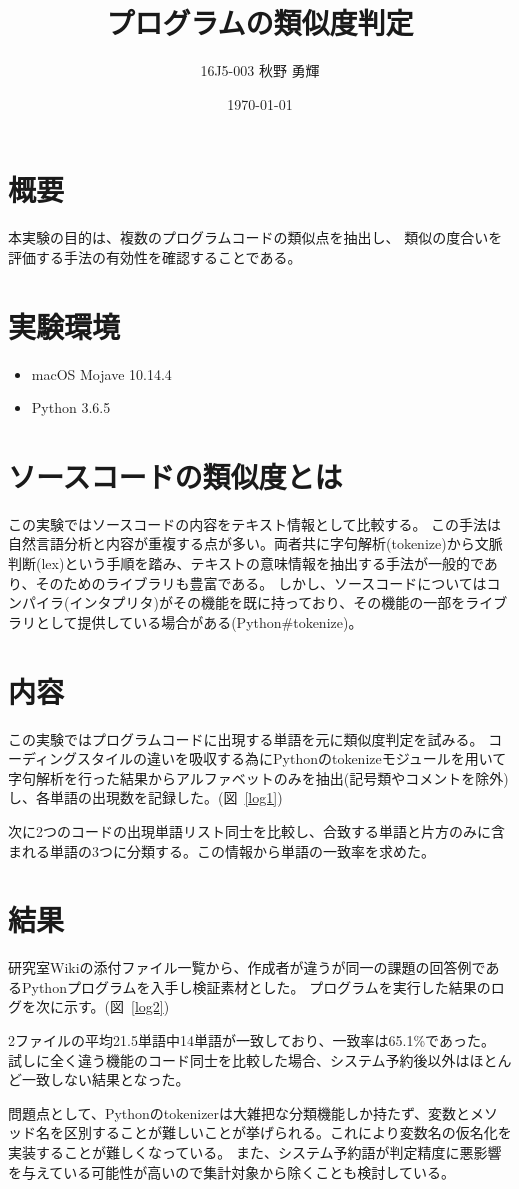 \documentclass[uplatex]{jsarticle}
\title{プログラムの類似度判定}
\author{16J5-003 秋野 勇輝}
\date{\today}
\begin{document}
\maketitle
\begin{multicols}{2}
\section{概要}
本実験の目的は、複数のプログラムコードの類似点を抽出し、
類似の度合いを評価する手法の有効性を確認することである。
\section{実験環境}
\begin{itemize}
\item macOS Mojave 10.14.4
\item Python 3.6.5
\end{itemize}
\section{ソースコードの類似度とは}
この実験ではソースコードの内容をテキスト情報として比較する。
この手法は自然言語分析と内容が重複する点が多い。両者共に字句解析(tokenize)から文脈判断(lex)という手順を踏み、テキストの意味情報を抽出する手法が一般的であり、そのためのライブラリも豊富である。
しかし、ソースコードについてはコンパイラ(インタプリタ)がその機能を既に持っており、その機能の一部をライブラリとして提供している場合がある(Python\#tokenize)。
\section{内容}
この実験ではプログラムコードに出現する単語を元に類似度判定を試みる。
コーディングスタイルの違いを吸収する為にPythonのtokenizeモジュールを用いて字句解析を行った結果からアルファベットのみを抽出(記号類やコメントを除外)し、各単語の出現数を記録した。(図~\ref{log1})

次に2つのコードの出現単語リスト同士を比較し、合致する単語と片方のみに含まれる単語の3つに分類する。この情報から単語の一致率を求めた。
\section{結果}
研究室Wikiの添付ファイル一覧から、作成者が違うが同一の課題の回答例であるPythonプログラムを入手し検証素材とした。
プログラムを実行した結果のログを次に示す。(図~\ref{log2})

2ファイルの平均21.5単語中14単語が一致しており、一致率は65.1\%であった。
試しに全く違う機能のコード同士を比較した場合、システム予約後以外はほとんど一致しない結果となった。

問題点として、Pythonのtokenizerは大雑把な分類機能しか持たず、変数とメソッド名を区別することが難しいことが挙げられる。これにより変数名の仮名化を実装することが難しくなっている。
また、システム予約語が判定精度に悪影響を与えている可能性が高いので集計対象から除くことも検討している。
\end{multicols}
\newpage
\end{document}
